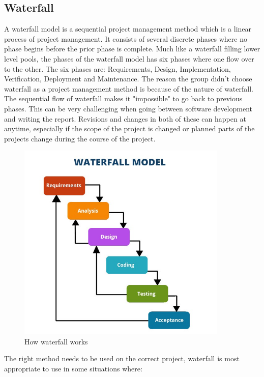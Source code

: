 \subsection{Waterfall} 
A waterfall model is a sequential project management method which is a linear process of project management\cite{Waterfall_model}. It consists of several discrete phases where no phase begins before the prior phase is complete. Much like a waterfall filling lower level pools, the phases of the waterfall model has six phases where one flow over to the other. The six phases are: Requirements, Design, Implementation, Verification, Deployment and Maintenance\cite{Waterfall_phases}. The reason the group didn't choose waterfall as a project management method is because of the nature of waterfall. The sequential flow of waterfall makes it "impossible" to go back to previous phases. This can be very challenging when going between software development and writing the report. Revisions and changes in both of these can happen at anytime, especially if the scope of the project is changed or planned parts of the projects change during the course of the project.
\begin{figure}
    \centering
    \includegraphics[width=100mm]{figures/waterfallMethods.png}
    \caption{How waterfall works}
    \label{fig:Waterfall_model}
\end{figure}
The right method needs to be used on the correct project, waterfall is most appropriate to use in some situations where:

